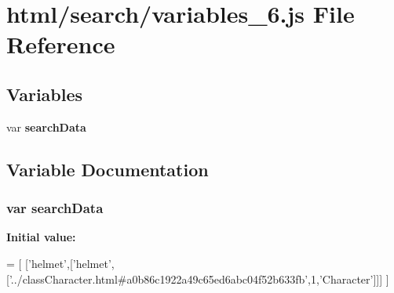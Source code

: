 \section{html/search/variables\-\_\-6.js File Reference}
\label{variables__6_8js}
\subsection*{Variables}
\begin{DoxyCompactItemize}
\item 
var {\bf search\-Data}
\end{DoxyCompactItemize}


\subsection{Variable Documentation}
\subsubsection[{search\-Data}]{\setlength{\rightskip}{0pt plus 5cm}var search\-Data}\label{variables__6_8js_ad01a7523f103d6242ef9b0451861231e}
{\bfseries Initial value\-:}
\begin{DoxyCode}
=
[
  [\textcolor{stringliteral}{'helmet'},[\textcolor{stringliteral}{'helmet'},[\textcolor{stringliteral}{'../classCharacter.html#a0b86c1922a49c65ed6abc04f52b633fb'},1,\textcolor{stringliteral}{'Character'}]]]
]
\end{DoxyCode}
